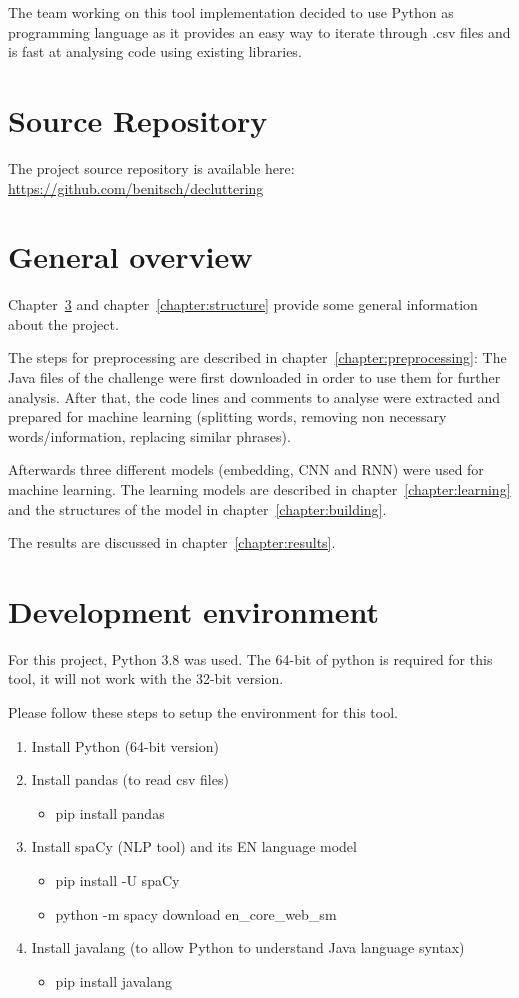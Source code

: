 \documentclass[runningheads]{llncs}
\begin{document}
The team working on this tool implementation decided to use Python as programming language as it provides an easy way to iterate through .csv files and is fast at analysing code using existing libraries.


\section{Source Repository}
The project source repository is available here: \url{https://github.com/benitsch/decluttering}


\section{General overview}
Chapter~\ref{chapter:env} and chapter~\ref{chapter:structure} provide some general information about the project.

The steps for preprocessing are described in chapter~\ref{chapter:preprocessing}: The Java files of the challenge were first downloaded in order to use them for further analysis. After that, the code lines and comments to analyse were extracted and prepared for machine learning (splitting words, removing non necessary words/information, replacing similar phrases).

Afterwards three different models (embedding, CNN and RNN) were used for machine learning. The learning models are described in chapter~\ref{chapter:learning} and the structures of the model in chapter~\ref{chapter:building}. 

The results are discussed in chapter~\ref{chapter:results}.


\section{Development environment}\label{chapter:env}
For this project, Python 3.8 was used. The 64-bit of python is required for this tool, it will not work with the 32-bit version.

Please follow these steps to setup the environment for this tool.
\begin{enumerate}
\item Install Python (64-bit version) \cite{ref_python}
\item Install pandas (to read csv files) \cite{ref_pandas}
\begin{itemize}\item pip install pandas\end{itemize}
\item Install spaCy (NLP tool) \cite{ref_spacy} and its EN language model \cite{ref_spacy_model}
\begin{itemize}\item pip install -U spaCy
\item python -m spacy download en\_core\_web\_sm
\end{itemize}
\item Install javalang (to allow Python to understand Java language syntax) \cite{ref_javalang}
\begin{itemize}\item pip install javalang\end{itemize}
\end{enumerate}
\end{document}
